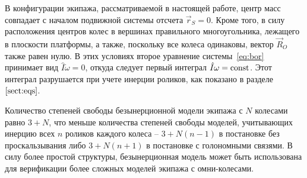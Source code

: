 В конфигурации экипажа, рассматриваемой в настоящей работе, центр масс совпадает с началом подвижной системы отсчета $\vec{r}_S = 0$. Кроме того, в силу расположения центров колес в вершинах правильного многоугольника, лежащего в плоскости платформы, а также, поскольку все колеса одинаковы, вектор $\vec{R}_O$ также равен нулю. В этих условиях второе уравнение системы~\ref{eq:bor} принимает вид $\hat{I}\dot{\omega} = 0$, откуда следует первый интеграл $\hat{I}\omega = \mathrm{const}$. Этот интеграл разрушается при учете инерции роликов, как показано в разделе~$\ref{sect:eqs}$.

Количество степеней свободы безынерционной модели экипажа с $N$ колесами равно $3 + N$, что меньше количества степеней свободы моделей, учитывающих инерцию всех $n$ роликов каждого колеса -- $3 + N(n - 1)$ в постановке без проскальзывания либо $3 + N(n + 1)$ в постановке с голономными связями. В силу более простой структуры, безынерционная модель может быть использована для верификации более сложных моделей экипажа с омни-колесами.